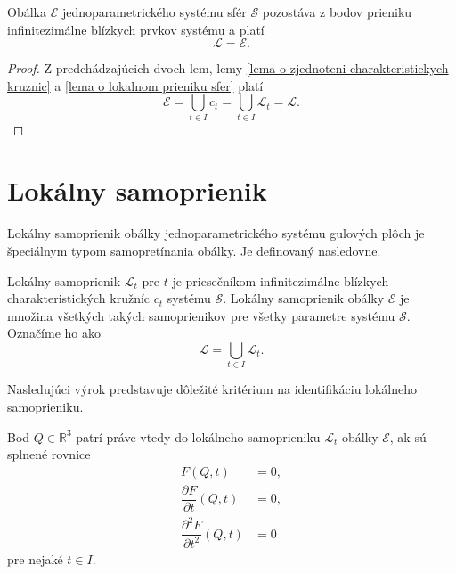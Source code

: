 \begin{theorem}
Obálka $\mathcal{E}$ jednoparametrického systému sfér $\mathcal{S}$ pozostáva z bodov prieniku infinitezimálne blízkych prvkov systému a platí $$
\mathcal{L} = \mathcal{E}.
$$
\end{theorem}

\begin{proof}
Z predchádzajúcich dvoch lem, lemy \ref{lema o zjednoteni charakteristickych kruznic} a \ref{lema o lokalnom prieniku sfer} platí 
$$ \mathcal{E} = \bigcup_{t \in I } c_t = \bigcup_{t \in I} \mathcal{L}_t = \mathcal{L}. $$
\end{proof}

\section{Lokálny samoprienik}
Lokálny samoprienik obálky jednoparametrického systému guľových plôch je špeciálnym typom samopretínania obálky. Je definovaný nasledovne.
\begin{definition} \label{definicia lokalny samoprienik}
Lokálny samoprienik $\mathcal{L}_{t}$ pre $t$ je priesečníkom infinitezimálne blízkych charakteristických kružníc $c_{t}$ systému $\mathcal{S}$. Lokálny samoprienik obálky $\mathcal{E}$ je množina všetkých takých samoprienikov pre všetky parametre systému $\mathcal{S}$. Označíme ho ako $$\mathcal{L} = \bigcup_{t \in I} \mathcal{L}_t.$$
\end{definition}

Nasledujúci výrok predstavuje dôležité kritérium na identifikáciu lokálneho samoprieniku.
\begin{lemma} \label{kriterium o lokalnom samoprieniku}
Bod $Q \in \mathbb{R}^3$ patrí práve vtedy do lokálneho samoprieniku $\mathcal{L}_{t}$ obálky $\mathcal{E}$, ak sú splnené rovnice
\begin{align*}
F(Q,t) &= 0, \\
\dfrac{\partial F}{\partial t}(Q,t) &= 0, \\
\dfrac{\partial^2 F}{\partial t^2}(Q,t) &= 0
\end{align*}
pre nejaké $t \in I.$
\end{lemma}

